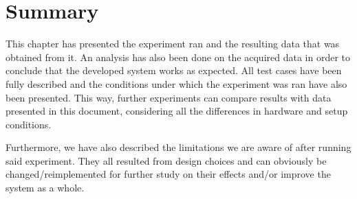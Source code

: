 \section{Summary}
This chapter has presented the experiment ran and the resulting data that was obtained from it.
An analysis has also been done on the acquired data in order to conclude that the developed system works as expected.
All test cases have been fully described and the conditions under which the experiment was ran have also been presented.
This way, further experiments can compare results with data presented in this document, considering all the differences in hardware and setup conditions.

Furthermore, we have also described the limitations we are aware of after running said experiment.
They all resulted from design choices and can obviously be changed/reimplemented for further study on their effects and/or improve the system as a whole.
